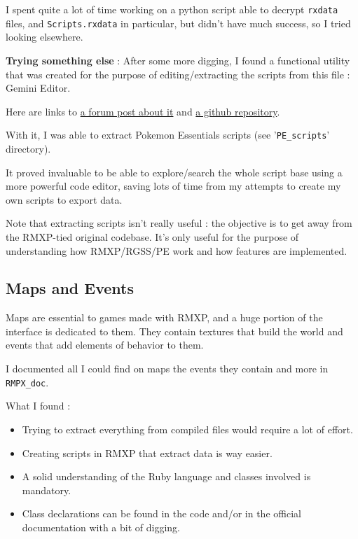 \documentclass[11pt]{article}
\begin{document}
I spent quite a lot of time working on a python script able to decrypt \verb|rxdata| files, and \verb|Scripts.rxdata| in particular, but didn't have much success, so I tried looking elsewhere.

\textbf{Trying something else} : After some more digging, I found a functional utility that was created for the purpose of editing/extracting the scripts from this file : Gemini Editor.

Here are links to \href{https://forum.chaos-project.com/index.php/topic,10420.0.html}{a forum post about it} and \href{https://github.com/terabin/Gemini}{a github repository}.

With it, I was able to extract Pokemon Essentials scripts (see '\verb|PE_scripts|' directory).

It proved invaluable to be able to explore/search the whole script base using a more powerful code editor, saving lots of time from my attempts to create my own scripts to export data.

Note that extracting scripts isn't really useful : the objective is to get away from the RMXP-tied original codebase. It's only useful for the purpose of understanding how RMXP/RGSS/PE work and how features are implemented.


\subsection{Maps and Events}

Maps are essential to games made with RMXP, and a huge portion of the interface is dedicated to them. They contain textures that build the world and events that add elements of behavior to them.

I documented all I could find on maps the events they contain and more in \verb|RMPX_doc|.

\newpage
What I found :
\begin{itemize}
	\item Trying to extract everything from compiled files would require a lot of effort.
	
	\item Creating scripts in RMXP that extract data is way easier.
	
	\item A solid understanding of the Ruby language and classes involved is mandatory.
	
	\item Class declarations can be found in the code and/or in the official documentation with a bit of digging.
\end{itemize}
\end{document}
